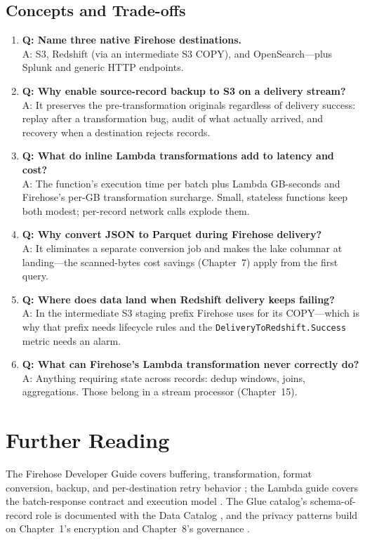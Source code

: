 \subsection{Concepts and Trade-offs}
\begin{enumerate}
    \item \textbf{Q: Name three native Firehose destinations.}\\
    A: S3, Redshift (via an intermediate S3 COPY), and OpenSearch---plus Splunk and generic HTTP endpoints.
    \item \textbf{Q: Why enable source-record backup to S3 on a delivery stream?}\\
    A: It preserves the pre-transformation originals regardless of delivery success: replay after a transformation bug, audit of what actually arrived, and recovery when a destination rejects records.
    \item \textbf{Q: What do inline Lambda transformations add to latency and cost?}\\
    A: The function's execution time per batch plus Lambda GB-seconds and Firehose's per-GB transformation surcharge. Small, stateless functions keep both modest; per-record network calls explode them.
    \item \textbf{Q: Why convert JSON to Parquet during Firehose delivery?}\\
    A: It eliminates a separate conversion job and makes the lake columnar at landing---the scanned-bytes cost savings (Chapter~7) apply from the first query.
    \item \textbf{Q: Where does data land when Redshift delivery keeps failing?}\\
    A: In the intermediate S3 staging prefix Firehose uses for its COPY---which is why that prefix needs lifecycle rules and the \texttt{DeliveryToRedshift.Success} metric needs an alarm.
    \item \textbf{Q: What can Firehose's Lambda transformation never correctly do?}\\
    A: Anything requiring state across records: dedup windows, joins, aggregations. Those belong in a stream processor (Chapter~15).
\end{enumerate}

\section{Further Reading}
The Firehose Developer Guide covers buffering, transformation, format conversion, backup, and per-destination retry behavior \cite{awsFirehoseDocs}; the Lambda guide covers the batch-response contract and execution model \cite{awsLambdaDocs}. The Glue catalog's schema-of-record role is documented with the Data Catalog \cite{awsGlueCatalogDocs}, and the privacy patterns build on Chapter~1's encryption and Chapter~8's governance \cite{awsKMSDocs,awsLakeFormationDocs}.

